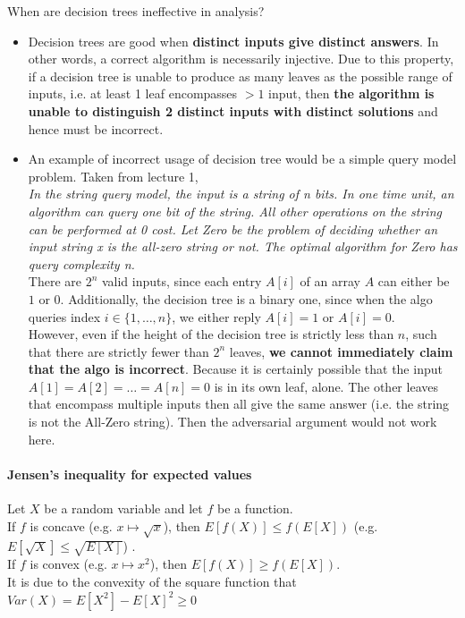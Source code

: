 \documentclass{article}
\begin{document}
When are decision trees ineffective in analysis?
\begin{itemize}
	\item Decision trees are good when \textbf{distinct inputs give distinct answers}. In other words, a correct algorithm is necessarily injective. Due to this property, if a decision tree is unable to produce as many leaves as the possible range of inputs, i.e. at least 1 leaf encompasses $>1$ input, then \textbf{the algorithm is unable to distinguish 2 distinct inputs with distinct solutions} and hence must be incorrect. 
	\item An example of incorrect usage of decision tree would be a simple query model problem. Taken from lecture 1,\\
	\textit{In the string query model, the input is a string of n bits. In one time unit, an algorithm can query one bit of the string. All other operations on the string can be performed at 0 cost. Let Zero be the problem of deciding whether an input string x is the all-zero string or not. The optimal algorithm for Zero has query complexity n.}\\
	There are $2^n$ valid inputs, since each entry $A[i]$ of an array $A$ can either be $1$ or $0$. Additionally, the decision tree is a binary one, since when the algo queries index $i\in \{1,\dots,n\}$, we either reply $A[i]=1$ or $A[i]=0$.\\
	However, even if the height of the decision tree is strictly less than $n$, such that there are strictly fewer than $2^n$ leaves, \textbf{we cannot immediately claim that the algo is incorrect}. Because it is certainly possible that the input $A[1]=A[2]=\dots=A[n]=0$ is in its own leaf, alone. The other leaves that encompass multiple inputs then all give the same answer (i.e. the string is not the All-Zero string). Then the adversarial argument would not work here.
\end{itemize}


\paragraph{Jensen's inequality for expected values}\mbox{}

Let $X$ be a random variable and let $f$ be a function.\\
If $f$ is concave (e.g. $x\mapsto \sqrt{x}$), then $E[f(X)]\leq f(E[X])$ (e.g. $E[\sqrt{X}]\leq \sqrt{E[X]}$) .\\
If $f$ is convex (e.g. $x\mapsto x^2$), then $E[f(X)]\geq f(E[X])$.\\
It is due to the convexity of the square function that $Var(X) = E[X^2]-E[X]^2\geq 0$
\end{document}
